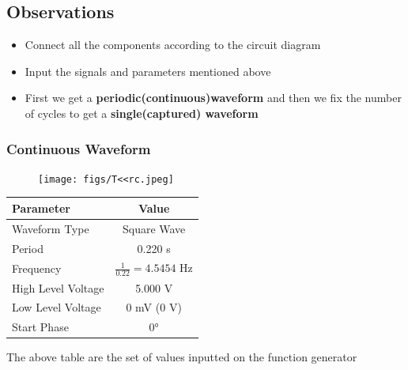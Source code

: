 \documentclass[journal]{IEEEtran}
\begin{document}
\subsection{Observations}
\begin{itemize}
    \item Connect all the components according to the circuit diagram 
    \item Input the signals and parameters mentioned above
    \item First we get a \textbf{periodic(continuous)waveform} and then we fix the number of cycles to get a \textbf{single(captured) waveform}  
\end{itemize}

\subsubsection{Continuous Waveform}
\begin{figure}[H]
    \centering
    \texttt{[image: figs/T<<rc.jpeg]}
\end{figure}
\begin{table}[h]
    \centering
    \renewcommand{\arraystretch}{1.3} %
    \begin{tabular}{|l|c|}
        \hline
        \textbf{Parameter} & \textbf{Value} \\
        \hline
        Waveform Type & Square Wave \\
        \hline
        Period & 0.220 s \\
        \hline
        Frequency & $\frac{1}{0.22} = 4.5454$ Hz \\
        \hline
        High Level Voltage & 5.000 V \\
        \hline
        Low Level Voltage & 0 mV (0 V) \\
        \hline
        Start Phase & 0° \\
        \hline
    \end{tabular}
\end{table}
The above table are the set of values inputted on the function generator
\end{document}
